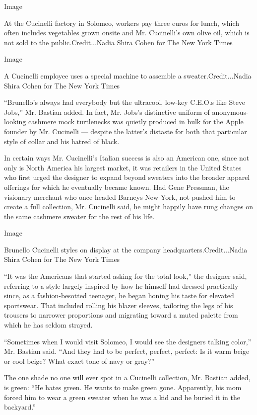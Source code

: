 Image

At the Cucinelli factory in Solomeo, workers pay three euros for lunch,
which often includes vegetables grown onsite and Mr. Cucinelli's own
olive oil, which is not sold to the public.Credit...Nadia Shira Cohen
for The New York Times

Image

A Cucinelli employee uses a special machine to assemble a
sweater.Credit...Nadia Shira Cohen for The New York Times

``Brunello's always had everybody but the ultracool, low-key C.E.O.s
like Steve Jobs,'' Mr. Bastian added. In fact, Mr. Jobs's distinctive
uniform of anonymous-looking cashmere mock turtlenecks was quietly
produced in bulk for the Apple founder by Mr. Cucinelli --- despite the
latter's distaste for both that particular style of collar and his
hatred of black.

In certain ways Mr. Cucinelli's Italian success is also an American one,
since not only is North America his largest market, it was retailers in
the United States who first urged the designer to expand beyond sweaters
into the broader apparel offerings for which he eventually became known.
Had Gene Pressman, the visionary merchant who once headed Barneys New
York, not pushed him to create a full collection, Mr. Cucinelli said, he
might happily have rung changes on the same cashmere sweater for the
rest of his life.

Image

Brunello Cucinelli styles on display at the company
headquarters.Credit...Nadia Shira Cohen for The New York Times

``It was the Americans that started asking for the total look,'' the
designer said, referring to a style largely inspired by how he himself
had dressed practically since, as a fashion-besotted teenager, he began
honing his taste for elevated sportswear. That included rolling his
blazer sleeves, tailoring the legs of his trousers to narrower
proportions and migrating toward a muted palette from which he has
seldom strayed.

``Sometimes when I would visit Solomeo, I would see the designers
talking color,'' Mr. Bastian said. ``And they had to be perfect,
perfect, perfect: Is it warm beige or cool beige? What exact tone of
navy or gray?''

The one shade no one will ever spot in a Cucinelli collection, Mr.
Bastian added, is green: ``He hates green. He wants to make green gone.
Apparently, his mom forced him to wear a green sweater when he was a kid
and he buried it in the backyard.''

